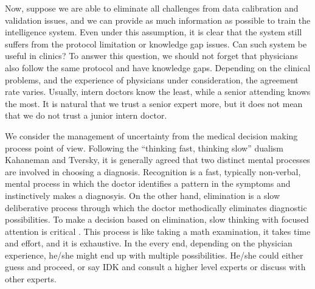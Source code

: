 \documentclass[9pt,twocolumn,twoside]{pnas-new}
\begin{document}
Now, suppose we are able to eliminate all challenges from data
calibration and validation issues, and we can provide as much
information as possible to train the intelligence system. Even under
this assumption, it is clear that the system still suffers from the
protocol limitation or knowledge gap issues. Can such system be useful
in clinics? To answer this question, we should not forget that
physicians also follow the same protocol and have knowledge
gaps. Depending on the clinical problems, and the experience of
physicians under consideration, the agreement rate varies. Usually,
intern doctors know the least, while a senior attending knows the
most. It is natural that we trust a senior expert more, but it does
not mean that we do not trust a junior intern doctor.

\iffalse %
The boundary of trust or not depends on the problem, and how sure the physicians know the answer. 
%
It is clearly challenging to evaluate how sure the physician is. But
when we train an intelligent system, we can easily quantify how sure
the system is about a question -- usually it is the score calculated
by the system from the input data. In a binary classification problem,
the higher or the lower the score is, the more certain the system is
about the answer to the input data. When the score is in the middle,
we could interpret that the system is {\em not sure} about the answer
to the input data, or {\em it doesn't know} (IDK).
\fi

We consider the management of uncertainty from the medical decision making process
point of view\cite{vordermark2019introduction}.
Following the ``thinking fast, thinking slow'' dualism Kahaneman and
Tversky, it is generally agreed that
two distinct mental processes are involved in choosing a diagnosis.
Recognition is a fast, typically non-verbal, mental process in which
the doctor identifies a pattern in the symptoms and instinctively
makes a diagnosyis. On the other hand, elimination is a slow
deliberative process through which the doctor methodically eliminates
diagnostic possibilities.
 To make a decision based
on elimination, slow thinking with focused attention is critical
\cite{michel2020thinking}. This process is like taking a math
examination, it takes time and effort, and it is exhaustive. In the
every end, depending on the physician experience, he/she might end up
with multiple possibilities. He/she could either guess and proceed, or
say IDK and consult a higher level experts or discuss with other
experts.
\end{document}
